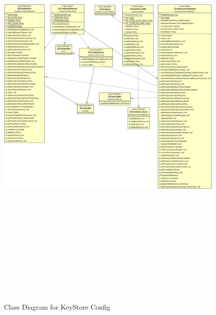 \documentclass[12pt]{book}
\begin{document}
  \begin{figure}[H]
   \centering
   \includegraphics[width=17cm, height=22cm]{images/configelement_keyStore}
   \caption{Class Diagram for KeyStore Config\label{fig:fig5_JMeter}}
  \end{figure}
  
\end{document}
